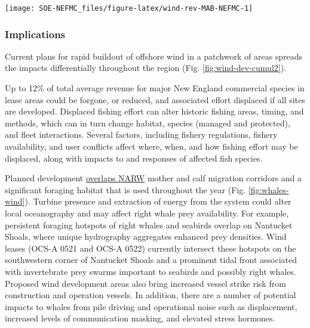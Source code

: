 \documentclass[
  10pt,
]{article}
\let\origfigure\figure
\let\endorigfigure\endfigure
\renewenvironment{figure}[1][2] {
    \expandafter\origfigure\expandafter[H]
} {
    \endorigfigure
}
\begin{document}
\begin{figure}

\texttt{[image: SOE-NEFMC\_files/figure-latex/wind-rev-MAB-NEFMC-1]} \hfill{}

\caption{Percent of Mid-Atlantic port revenue with majority NEFMC landings from Wind Energy Areas (WEA) in descending order from most to least port fisheries revenue from WEA. EJ = Environmental Justice.}\label{fig:wind-rev-MAB-NEFMC}
\end{figure}

\hypertarget{implications-6}{%
\subsubsection{Implications}\label{implications-6}}

Current plans for rapid buildout of offshore wind in a patchwork of areas spreads the impacts differentially throughout the region (Fig. \ref{fig:wind-dev-cumul2}).

Up to 12\% of total average revenue for major New England commercial species in lease areas could be forgone, or reduced, and associated effort displaced if all sites are developed. Displaced fishing effort can alter historic fishing areas, timing, and methods, which can in turn change habitat, species (managed and protected), and fleet interactions. Several factors, including fishery regulations, fishery availability, and user conflicts affect where, when, and how fishing effort may be displaced, along with impacts to and responses of affected fish species.

Planned development \href{https://noaa-edab.github.io/catalog/right-whale-abundance.html}{overlaps NARW} mother and calf migration corridors and a significant foraging habitat that is used throughout the year (Fig. \ref{fig:whales-wind}). Turbine presence and extraction of energy from the system could alter local oceanography and may affect right whale prey availability. For example, persistent foraging hotspots of right whales and seabirds overlap on Nantucket Shoals, where unique hydrography aggregates enhanced prey densities. Wind leases (OCS-A 0521 and OCS-A 0522) currently intersect these hotspots on the southwestern corner of Nantucket Shoals and a prominent tidal front associated with invertebrate prey swarms important to seabirds and possibly right whales. Proposed wind development areas also bring increased vessel strike risk from construction and operation vessels. In addition, there are a number of potential impacts to whales from pile driving and operational noise such as displacement, increased levels of communication masking, and elevated stress hormones.
\end{document}
